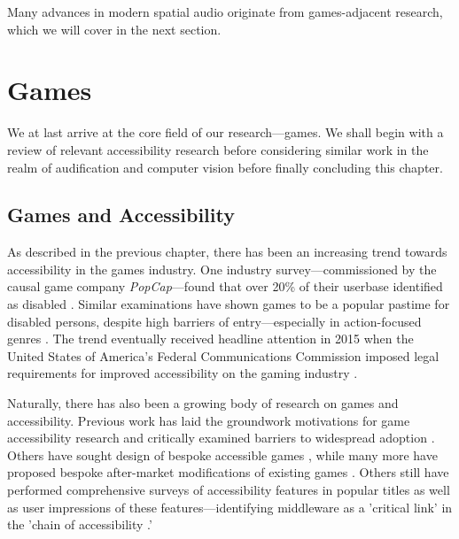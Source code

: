 \documentclass{report}
\begin{document}
Many advances in modern spatial audio originate from games-adjacent research, which we will cover in the next section. 

\section{Games}
We at last arrive at the core field of our research---games. We shall begin with a review of relevant accessibility research before considering similar work in the realm of audification and computer vision before finally concluding this chapter. 

\subsection{Games and Accessibility}
As described in the previous chapter, there has been an increasing trend towards accessibility in the games industry. One industry survey---commissioned by the causal game company \emph{PopCap}---found that over 20\% of their userbase identified as disabled \cite{Popcap_2008}. Similar examinations have shown games to be a popular pastime for disabled persons, despite high barriers of entry---especially in action-focused genres \cite{yuan2011game}. The trend eventually received headline attention in 2015 when the United States of America's Federal Communications Commission imposed legal requirements for improved accessibility on the gaming industry \cite{Richert}.

Naturally, there has also been a growing body of research on games and accessibility. Previous work has laid the groundwork motivations for game accessibility research \cite{miesenberger2008more} \cite{garber2013game} and critically examined barriers to widespread adoption \cite{porter2013empirical}. Others have sought design of bespoke accessible games \cite{AudioArchery}, while many more have proposed bespoke after-market modifications of existing games \cite{atkinson2006making}. Others still have performed comprehensive surveys of accessibility features in popular titles as well as user impressions of these features---identifying middleware as a 'critical link' in the 'chain of accessibility \cite{porter2013empirical}.'
\end{document}
